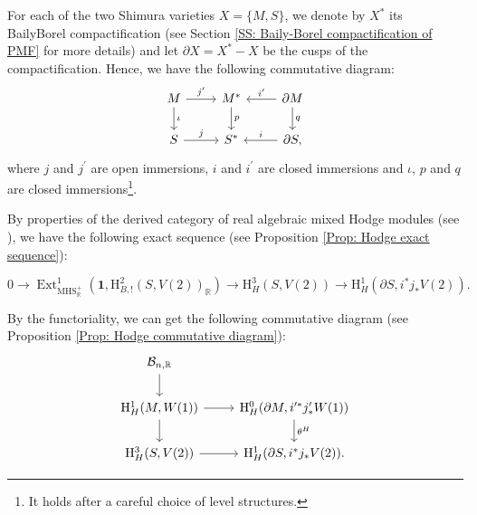 \documentclass[11pt, a4paper]{amsart}
\theoremstyle{plain}
\theoremstyle{definition}
\numberwithin{equation}{section}
\def\RR{\mathbb{R}}
\DeclareMathOperator{\Ext}{Ext}
\begin{document}
\par For each of the two Shimura varieties $X = \{M, S\}$, we denote by $X^{*}$ its Baily{\textendash}Borel compactification (see Section \ref{SS: Baily-Borel compactification of PMF} for more details) and let $\partial{X} = X^{*} - X$ be the cusps of the compactification. Hence, we have the following commutative diagram: 
\[
    \begin{tikzcd}
        M \ar[r, "j^{\prime}"] \ar[d, "{\iota}"] & M^{*} \ar[d, "p"] & \partial{M} \ar[l, "i^{\prime}" above] \ar[d, "q"] \\
        S \ar[r, "j"] & S^{*} & \partial{S} \ar[l, "i" above], 
    \end{tikzcd}
\]
where $j$ and $j^{\prime}$ are open immersions, $i$ and $i^{\prime}$ are  closed immersions and $\iota$, $p$ and $q$ are closed immersions\footnote{It holds after a careful choice of level structures.}. 

\par By properties of the derived category of real algebraic mixed Hodge modules (see \cite[Definition A.2.4]{HW98}), we have the following exact sequence (see Proposition \ref{Prop: Hodge exact sequence}):

\begin{equation}
\label{Intro: Hodge exact sequence}
    0 \rightarrow \Ext^{1}_{\mathrm{MHS}_{\RR}^{+}}(\mathbf{1}, \mathrm{H}^{2}_{B,!}(S, V(2))_{\RR}) \rightarrow \mathrm{H}^{3}_{H}(S,V(2)) \rightarrow \mathrm{H}^{1}_{H}(\partial{S}, i^{*}j_{*}V(2)).
\end{equation}

By the functoriality, we can get the following commutative diagram (see Proposition \ref{Prop: Hodge commutative diagram}): 
\begin{equation}
\label{Intro: Hodge commutative diagram}
    \begin{tikzcd}
        \mathcal{B}_{n, \RR} \ar[d] & \\
        \mathrm{H}^{1}_{H}(M,W(1)) \ar[r] \ar[d] & \mathrm{H}^{0}_{H}(\partial{M}, i^{\prime*}j^{\prime}_{*}W(1)) \ar[d, "\theta^{H}"] \\
        \mathrm{H}^{3}_{H}(S, V(2)) \ar[r] & \mathrm{H}^{1}_{H}(\partial{S}, i^{*}j_{*}V(2)). 
    \end{tikzcd}
\end{equation}
\end{document}
